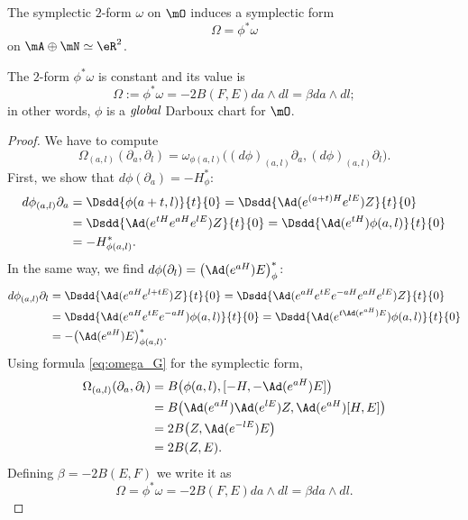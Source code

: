 The symplectic $2$-form $\omega$ on $\mO$ induces a symplectic form
\[
	\Omega=\phi^*\omega
\]
on $\mA\oplus\mN\simeq\eR^2$.

\begin{proposition}
	The $2$-form $\phi^*\omega$ is constant and its value is
	\[
		\Omega:=\phi^*\omega=-2B(F,E)da\wedge dl=\beta da\wedge dl;
	\]
	in other words, $\phi$ is a $\emph{global}$ Darboux chart for $\mO$.
	\label{prop:Omega}
\end{proposition}

\begin{proof}
	We have to compute
	\[
		\Omega_{(a,l)}(\partial_a,\partial_l)=\omega_{\phi(a,l)}\big( (d\phi)_{(a,l)}\partial_a,(d\phi)_{(a,l)}\partial_l\big).
	\]
	First, we show that $d\phi(\partial_a)=-H^*_{\phi}$:
	\[
		\begin{split}
			d\phi_{(a,l)}\partial_a&=\Dsdd{\phi(a+t,l)}{t}{0}
			=\Dsdd{\Ad(e^{(a+t)H}e^{lE})Z}{t}{0}\\
			&=\Dsdd{ \Ad(e^{tH}e^{aH}e^{lE})Z  }{t}{0}
			=\Dsdd{ \Ad(e^{tH})\phi(a,l) }{t}{0}\\
			&=-H^*_{\phi(a,l)}.
		\end{split}
	\]
	In the same way, we find $d\phi(\partial_l)=\big( \Ad(e^{aH})E\big)^*_{\phi}$:
	\[
		\begin{aligned}
			d\phi_{(a,l)}\partial_l & =\Dsdd{ \Ad(e^{aH}e^{l+tE})Z }{t}{0}
			=\Dsdd{ \Ad(e^{aH}e^{tE} e^{-aH}e^{aH}e^{lE} )Z }{t}{0}                     \\
			                        & =\Dsdd{ \Ad(e^{aH}e^{tE}e^{-aH})\phi(a,l) }{t}{0}
			=\Dsdd{ \Ad( e^{t\Ad(e^{aH})E} )\phi(a,l) }{t}{0}                           \\
			                        & =-\big( \Ad(e^{aH})E\big)^*_{\phi(a,l)}.
		\end{aligned}
	\]
	Using formula \eqref{eq:omega_G} for the symplectic form,
	\begin{equation}
		\begin{split}
			\Omega_{(a,l)}(\partial_a,\partial_l)&=B\big( \phi(a,l),[-H,-\Ad(e^{aH})E]\big) \\
			&=B\big( \Ad(e^{aH})\Ad(e^{lE})Z,\Ad(e^{aH})[H,E]\big)\\
			&=2B\big( Z,\Ad(e^{-lE})E \big)\\
			&=2B(Z,E).
		\end{split}
	\end{equation}
	Defining $\beta=-2B(E,F)$ we write it as
	\begin{equation}
		\Omega=\phi^*\omega=-2B(F,E)da\wedge dl=\beta da\wedge dl.
	\end{equation}
\end{proof}
